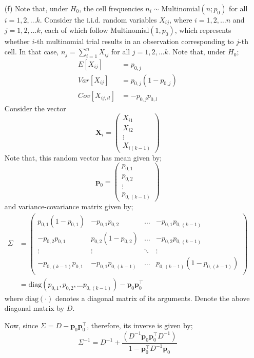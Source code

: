 \documentclass[12pt]{article}
\begin{document}
\begin{enumerate}
\begin{solution}
\begin{enumerate}
	\item[(f)] Note that, under $H_0$, the cell frequencies $n_i \sim \text{Multinomial}(n; p_0)$ for all $i=1,2,\dots k$. Consider the i.i.d. random variables $X_{ij}$, where $i=1,2,\dots n$ and $j=1,2,\dots k$, each of which follow $\text{Multinomial}(1, p_0)$, which represents whether $i$-th multinomial trial results in an observation corresponding to $j$-th cell. In that case, $n_j = \sum_{i=1}^{n}X_{ij}$ for all $j=1,2,\dots k$. Note that, under $H_0$;
	\begin{align*}
		E\left[X_{ij}\right] & = p_{0,j}\\
		Var\left[X_{ij}\right] & = p_{0,j}\left(1 - p_{0,j}\right)\\
		Cov\left[X_{ij, il}\right] & = -p_{0,j}p_{0,l}
	\end{align*}
	Consider the vector 
	$$\textbf{X}_i = \begin{pmatrix}
	X_{i1}\\
	X_{i2}\\
	\vdots\\
	X_{i(k-1)}
	\end{pmatrix}$$
	Note that, this random vector has mean given by;
	$$\textbf{p}_0 = \begin{pmatrix}
	p_{0,1}\\
	p_{0,2}\\
	\vdots\\
	p_{0,(k-1)}	
	\end{pmatrix}$$
	and variance-covariance matrix given by;
	\begin{align*}
		\Sigma & = \begin{pmatrix}
		p_{0,1}\left(1 - p_{0,1}\right) & -p_{0,1}p_{0,2} & \dots & -p_{0,1}p_{0,(k-1)} \\
		-p_{0,2}p_{0,1} & p_{0,2}\left(1 - p_{0,2}\right) & \dots & -p_{0,2}p_{0,(k-1)}\\
		\vdots & \vdots & \ddots & \vdots\\
		-p_{0,(k-1)}p_{0,1} & -p_{0,1}p_{0,(k-1)} &\dots & p_{0,(k-1)}\left(1 - p_{0,(k-1)}\right)\\	
		\end{pmatrix}\\
		& = \text{diag}\left(p_{0,1}, p_{0,2}, \dots p_{0,(k-1)}\right) - \textbf{p}_0\textbf{p}_0^{\intercal}	
	\end{align*}
	where $\text{diag}(\cdot)$ denotes a diagonal matrix of its arguments. Denote the above diagonal matrix by $D$.
	
	Now, since $\Sigma = D - \textbf{p}_0\textbf{p}_0^{\intercal}$, therefore, its inverse is given by;
	$$\Sigma^{-1} = D^{-1} + \dfrac{\left(D^{-1}\textbf{p}_0\textbf{p}_0^{\intercal}D^{-1}\right)}{1 - \textbf{p}_0^{\intercal}D^{-1}\textbf{p}_0}$$
	

\end{enumerate}
\end{solution}
\end{enumerate}
\end{document}
